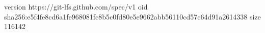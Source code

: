 version https://git-lfs.github.com/spec/v1
oid sha256:e5f4fe8cd6a1fe968081fc8b5c0fd80e5e9662abb56110cd57c64d91a2614338
size 116142
